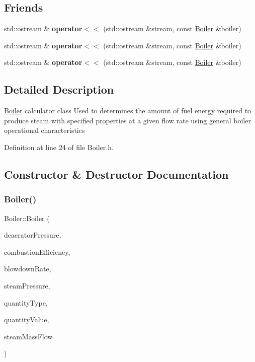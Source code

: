 \subsection*{Friends}
\begin{DoxyCompactItemize}
\item 
\mbox{\label{class_boiler_a8365324a41a1d924903364721826c993}} 
std\+::ostream \& {\bfseries operator$<$$<$} (std\+::ostream \&stream, const \hyperlink{class_boiler}{Boiler} \&boiler)
\item 
\mbox{\label{class_boiler_a8365324a41a1d924903364721826c993}} 
std\+::ostream \& {\bfseries operator$<$$<$} (std\+::ostream \&stream, const \hyperlink{class_boiler}{Boiler} \&boiler)
\item 
\mbox{\label{class_boiler_a8365324a41a1d924903364721826c993}} 
std\+::ostream \& {\bfseries operator$<$$<$} (std\+::ostream \&stream, const \hyperlink{class_boiler}{Boiler} \&boiler)
\end{DoxyCompactItemize}


\subsection{Detailed Description}
\hyperlink{class_boiler}{Boiler} calculator class Used to determines the amount of fuel energy required to produce steam with specified properties at a given flow rate using general boiler operational characteristics 

Definition at line 24 of file Boiler.\+h.



\subsection{Constructor \& Destructor Documentation}
\mbox{\label{class_boiler_adebe1dca06edc8dbca462e226b4dd9d5}} 
\subsubsection{\texorpdfstring{Boiler()}{Boiler()}\hspace{0.1cm}{\footnotesize\ttfamily [1/3]}}
{\footnotesize\ttfamily Boiler\+::\+Boiler (\begin{DoxyParamCaption}\item[{double}]{deaerator\+Pressure,  }\item[{double}]{combustion\+Efficiency,  }\item[{double}]{blowdown\+Rate,  }\item[{double}]{steam\+Pressure,  }\item[{\hyperlink{class_steam_properties_ae0294bedf7d178c2d8fb6aed0f62fbff}{Steam\+Properties\+::\+Thermodynamic\+Quantity}}]{quantity\+Type,  }\item[{double}]{quantity\+Value,  }\item[{double}]{steam\+Mass\+Flow }\end{DoxyParamCaption})}

